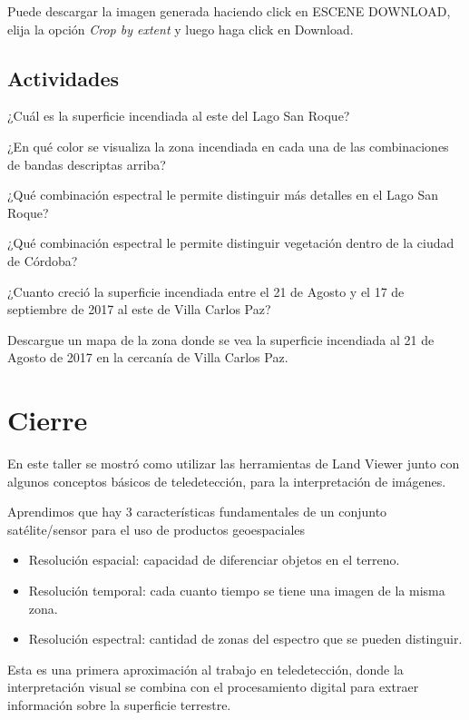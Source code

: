 \documentclass[a4paper,12pt]{book}
\begin{document}
Puede descargar la imagen generada haciendo click en ESCENE DOWNLOAD, elija la opción  \emph{Crop by extent} y luego haga click en Download.

\section{Actividades}

\begin{que}
    ¿Cuál es la superficie incendiada al este del Lago San Roque?
\end{que}

\begin{que}
    ¿En qué color se visualiza la zona incendiada en cada una de las combinaciones de bandas descriptas arriba?
\end{que}

\begin{que}
    ¿Qué combinación espectral le permite distinguir más detalles en el Lago San Roque?
\end{que}

\begin{que}
    ¿Qué combinación espectral le permite distinguir vegetación dentro de la ciudad de Córdoba?
\end{que}

\begin{que}
    ¿Cuanto creció la superficie incendiada entre el 21 de Agosto y el 17 de septiembre de 2017 al este de Villa Carlos Paz?
\end{que}

\begin{que}
    Descargue un mapa de la zona donde se vea la superficie incendiada al 21 de Agosto de 2017 en la cercanía de Villa Carlos Paz.
\end{que}

\chapter{Cierre}

En este taller se mostró como utilizar las herramientas de Land Viewer junto con algunos conceptos básicos de teledetección, para la interpretación de imágenes.

Aprendimos que hay 3 características fundamentales de un conjunto satélite/sensor para el uso de productos geoespaciales

\begin{itemize}
    \item Resolución espacial: capacidad de diferenciar objetos en el terreno.
    \item Resolución temporal: cada cuanto tiempo se tiene una imagen de la misma zona.
    \item Resolución espectral: cantidad de zonas del espectro que se pueden distinguir.
\end{itemize}

Esta es una primera aproximación al trabajo en teledetección, donde la interpretación visual se combina con el procesamiento digital para extraer información sobre la superficie terrestre.
\end{document}
